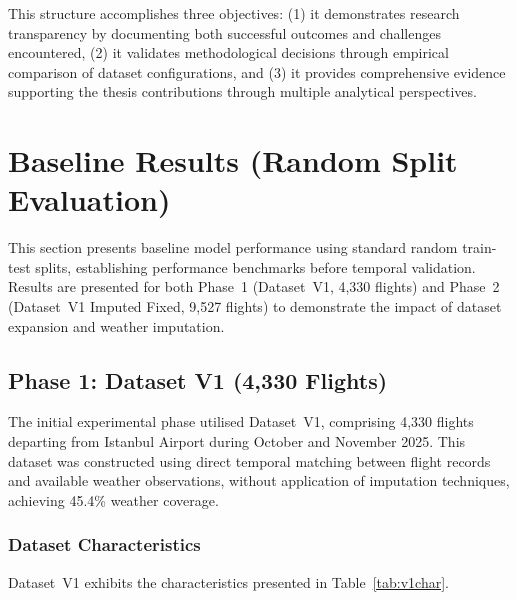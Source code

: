 \documentclass{report}
\begin{document}
This structure accomplishes three objectives: (1) it demonstrates research
transparency by documenting both successful outcomes and challenges encountered,
(2) it validates methodological decisions through empirical comparison of
dataset configurations, and (3) it provides comprehensive evidence supporting
the thesis contributions through multiple analytical perspectives.

\section{Baseline Results (Random Split Evaluation)}
\label{sec:baseline}

This section presents baseline model performance using standard random
train-test splits, establishing performance benchmarks before temporal
validation.  Results are presented for both Phase~1 (Dataset~V1, 4,330
flights) and Phase~2 (Dataset~V1 Imputed Fixed, 9,527 flights) to demonstrate
the impact of dataset expansion and weather imputation.

\subsection{Phase 1: Dataset V1 (4,330 Flights)}

The initial experimental phase utilised Dataset~V1, comprising 4,330 flights
departing from Istanbul Airport during October and November 2025.  This
dataset was constructed using direct temporal matching between flight records
and available weather observations, without application of imputation
techniques, achieving 45.4\% weather coverage.

\subsubsection*{Dataset Characteristics}

Dataset~V1 exhibits the characteristics presented in Table~\ref{tab:v1char}.
\end{document}
